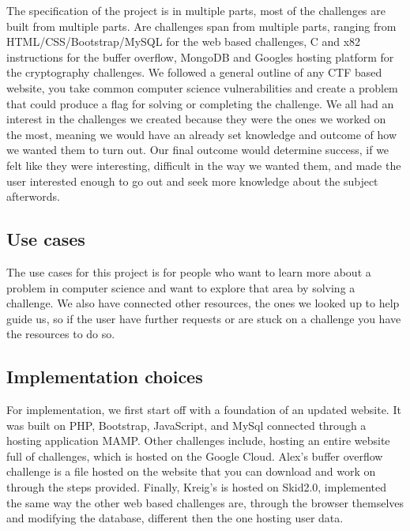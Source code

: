 \documentclass[runningheads,a4paper]{llncs}
\begin{document}
The specification of the project is in multiple parts, most of the challenges are built from multiple parts. Are challenges span from multiple parts, ranging from HTML/CSS/Bootstrap/MySQL for the web based challenges, C and x82 instructions for the buffer overflow, MongoDB and Googles hosting platform for the cryptography challenges. We followed a general outline of any CTF based website, you take common computer science vulnerabilities and create a problem that could produce a flag for solving or completing the challenge. We all had an interest in the challenges we created because they were the ones we worked on the most, meaning we would have an already set knowledge and outcome of how we wanted them to turn out. Our final outcome would determine success, if we felt like they were interesting, difficult in the way we wanted them, and made the user interested enough to go out and seek more knowledge about the subject afterwords.

\subsection{Use cases}
The use cases for this project is for people who want to learn more about a problem in computer science and want to explore that area by solving a challenge. We also have connected other resources, the ones we looked up to help guide us, so if the user have further requests or are stuck on a challenge you have the resources to do so.

\subsection{Implementation choices}

For implementation, we first start off with a foundation of an updated website. It was built on PHP, Bootstrap, JavaScript, and MySql connected through a hosting application MAMP. Other challenges include, hosting an entire website full of challenges, which is hosted on the Google Cloud. Alex’s buffer overflow challenge is a file hosted on the website that you can download and work on through the steps provided. Finally, Kreig’s is hosted on Skid2.0, implemented the same way the other web based challenges are, through the browser themselves and modifying the database, different then the one hosting user data.
\end{document}
